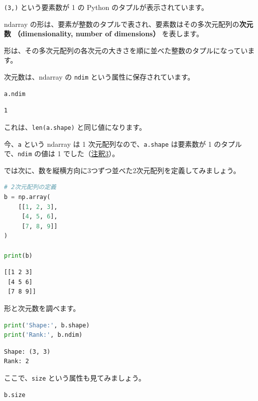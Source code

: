 \texttt{(3,)} という要素数が 1 の Python のタプルが表示されています。

ndarray の形は、要素が整数のタプルで表され、要素数はその多次元配列の\textbf{次元数 （dimensionality, number of dimensions）} を表します。

形は、その多次元配列の各次元の大きさを順に並べた整数のタプルになっています。


次元数は、ndarray の \texttt{ndim} という属性に保存されています。


\begin{lstlisting}[style=codecell,language=Python]
a.ndim
\end{lstlisting}

\begin{lstlisting}[style=outputcell]
1
\end{lstlisting}

これは、\texttt{len(a.shape)} と同じ値になります。

今、\texttt{a} という ndarray は 1 次元配列なので、\texttt{a.shape} は要素数が 1 のタプルで、\texttt{ndim} の値は 1 でした（\hyperref[03-reviewing-elementary-math-with-numpy-and-matplotlib-note3]{注釈3}）。


では次に、数を縦横方向に3つずつ並べた2次元配列を定義してみましょう。


\begin{lstlisting}[style=codecell,language=Python]
# 2次元配列の定義
b = np.array(
    [[1, 2, 3],
     [4, 5, 6],
     [7, 8, 9]]
)

print(b)
\end{lstlisting}

\begin{lstlisting}[style=outputcell]
[[1 2 3]
 [4 5 6]
 [7 8 9]]
\end{lstlisting}

形と次元数を調べます。


\begin{lstlisting}[style=codecell,language=Python]
print('Shape:', b.shape)
print('Rank:', b.ndim)
\end{lstlisting}

\begin{lstlisting}[style=outputcell]
Shape: (3, 3)
Rank: 2
\end{lstlisting}

ここで、\texttt{size} という属性も見てみましょう。


\begin{lstlisting}[style=codecell,language=Python]
b.size
\end{lstlisting}

